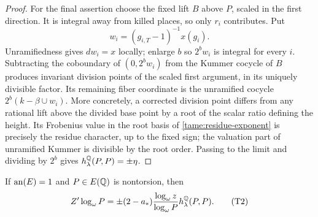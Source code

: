 \begin{proof}
For the final assertion choose the fixed lift \(B\) above \(P\),
scaled in the first direction. It is integral away from killed
places, so only \(r_i\) contributes. Put
\[
 w_i=(g_{i,T}-1)^{-1}x(g_i).
\]
Unramifiedness gives \(dw_i=x\) locally; enlarge \(b\) so
\(2^bw_i\) is integral for every \(i\). Subtracting the coboundary
of \((0,2^bw_i)\) from the Kummer cocycle of \(B\) produces invariant
division points of the scaled first argument, in its uniquely
divisible factor. Its remaining fiber coordinate is the unramified
cocycle \(2^b(k-\beta\cup w_i)\). More concretely, a corrected
division point differs from any rational lift above the divided
base point by a root of the scalar ratio defining the height.
Its Frobenius value in the root basis of
\eqref{tame:residue-exponent} is precisely the residue character,
up to the fixed sign; the valuation part of unramified Kummer
is divisible by the root order. Passing to the limit and dividing
by \(2^b\) gives \(h_\lambda^\mathbb Q(P,P)=\pm\eta\).
\end{proof}

\begin{lemma}\label{tame:cup}
If \(\operatorname{an}(E)=1\) and \(P\in E(\mathbb Q)\) is nontorsion, then
\[
 Z'\log_\omega P
  =\pm(2-a_*)\frac{\log_\omega z}{\log_\omega P}
       h_\lambda^\mathbb Q(P,P).
 \tag{T2}\label{eq:T2}
\]
\end{lemma}

